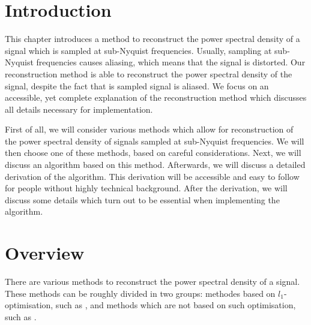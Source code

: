 \documentclass[a4paper, openany, oneside]{memoir}
\begin{document}

\section{Introduction}
This chapter introduces a method to reconstruct the power spectral density of a signal which is sampled at sub-Nyquist frequencies. Usually, sampling at sub-Nyquist frequencies causes aliasing, which means that the signal is distorted. Our reconstruction method is able to reconstruct the power spectral density of the signal, despite the fact that is sampled signal is aliased. We focus on an accessible, yet complete explanation of the reconstruction method which discusses all details necessary for implementation.

First of all, we will consider various methods which allow for reconstruction of the power spectral density of signals sampled at sub-Nyquist frequencies. We will then choose one of these methods, based on careful considerations. Next, we will discuss an algorithm based on this method. Afterwards, we will discuss a detailed derivation of the algorithm. This derivation will be accessible and easy to follow for people without highly technical background. After the derivation, we will discuss some details which turn out to be essential when implementing the algorithm.

\section{Overview}
There are various methods to reconstruct the power spectral density of a signal. These methods can be roughly divided in two groups: methodes based on $l_1$-optimisation, such as \cite{bayarkernel, candes2006robust, candes2007sparsity, candes2008introduction, kirolos2006analog, li2014gomp, polo2009compressive, pal2011coprime}, and methods which are not based on such optimisation, such as \cite{ariananda2011multicoset,ariananda2012compressive}.
\end{document}
